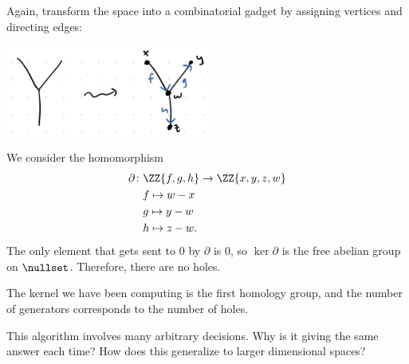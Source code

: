 \documentclass{standalone}
\begin{document}
\begin{example}
  Again, transform the space into a combinatorial gadget by assigning
  vertices and directing edges:
  \begin{center}
    \includegraphics[width=0.5\textwidth]{18_905-200902-3.png}
  \end{center}
  We consider the homomorphism
  \begin{align*}
    \partial \colon & \ZZ\{f, g, h\} \to \ZZ\{x, y, z, w\} \\
      & f \mapsto w - x \\
      & g \mapsto y - w \\
      & h \mapsto z - w.
  \end{align*}
  The only element that gets sent to \(0\) by \(\partial\) is \(0\),
  so \(\ker \partial\) is the free abelian group on \(\nullset\).
  Therefore, there are no holes.
\end{example}

The kernel we have been computing is the first homology group,
and the number of generators corresponds to the number of holes.

This algorithm involves many arbitrary decisions.
  Why is it giving the same answer each time?
  How does this generalize to larger dimensional spaces?
\end{document}
